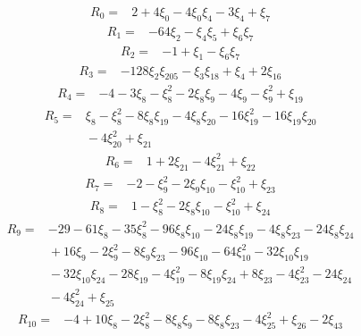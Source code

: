 \begingroup
\small
\setlength{\jot}{2pt}
\[
\begin{aligned}
 R_{0}={}&2+4\xi_{0}-4\xi_{0}\xi_{4}-3\xi_{4}+\xi_{7}
\end{aligned}
\]
\[
\begin{aligned}
 R_{1}={}&-64\xi_{2}-\xi_{4}\xi_{5}+\xi_{6}\xi_{7}
\end{aligned}
\]
\[
\begin{aligned}
 R_{2}={}&-1+\xi_{1}-\xi_{6}\xi_{7}
\end{aligned}
\]
\[
\begin{aligned}
 R_{3}={}&-128\xi_{2}\xi_{205}-\xi_{3}\xi_{18}+\xi_{4}+2\xi_{16}
\end{aligned}
\]
\[
\begin{aligned}
 R_{4}={}&-4-3\xi_{8}-\xi_{8}^{2}-2\xi_{8}\xi_{9}-4\xi_{9}-\xi_{9}^{2}+\xi_{19}
\end{aligned}
\]
\[
\begin{aligned}
 R_{5}={}&\xi_{8}-\xi_{8}^{2}-8\xi_{8}\xi_{19}-4\xi_{8}\xi_{20}-16\xi_{19}^{2}-16\xi_{19}\xi_{20}\\
 &{}-4\xi_{20}^{2}+\xi_{21}
\end{aligned}
\]
\[
\begin{aligned}
 R_{6}={}&1+2\xi_{21}-4\xi_{21}^{2}+\xi_{22}
\end{aligned}
\]
\[
\begin{aligned}
 R_{7}={}&-2-\xi_{9}^{2}-2\xi_{9}\xi_{10}-\xi_{10}^{2}+\xi_{23}
\end{aligned}
\]
\[
\begin{aligned}
 R_{8}={}&1-\xi_{8}^{2}-2\xi_{8}\xi_{10}-\xi_{10}^{2}+\xi_{24}
\end{aligned}
\]
\[
\begin{aligned}
 R_{9}={}&-29-61\xi_{8}-35\xi_{8}^{2}-96\xi_{8}\xi_{10}-24\xi_{8}\xi_{19}-4\xi_{8}\xi_{23}-24\xi_{8}\xi_{24}\\
 &{}+16\xi_{9}-2\xi_{9}^{2}-8\xi_{9}\xi_{23}-96\xi_{10}-64\xi_{10}^{2}-32\xi_{10}\xi_{19}\\
 &{}-32\xi_{10}\xi_{24}-28\xi_{19}-4\xi_{19}^{2}-8\xi_{19}\xi_{24}+8\xi_{23}-4\xi_{23}^{2}-24\xi_{24}\\
 &{}-4\xi_{24}^{2}+\xi_{25}
\end{aligned}
\]
\[
\begin{aligned}
 R_{10}={}&-4+10\xi_{8}-2\xi_{8}^{2}-8\xi_{8}\xi_{9}-8\xi_{8}\xi_{23}-4\xi_{25}^{2}+\xi_{26}-2\xi_{43}
\end{aligned}
\]

